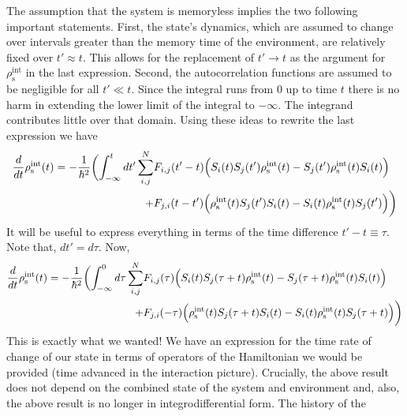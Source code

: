 \documentclass{article}
\begin{document}
The assumption that the system is memoryless implies the two following important
statements. First, the state's dynamics, which are assumed to change over intervals greater
than the memory time of the environment, are relatively fixed over $ t' \approx
t $. This allows for the replacement of $ t' \rightarrow t $ as the argument for
$ \rho_{\textrm{s}}^{\textrm{int}} $ in the last expression. Second, the
autocorrelation functions are assumed to be negligible for all $ t' \ll t $.
Since the integral runs from 0 up to time $ t $ there is no harm in extending
the lower limit of the integral to $ -\infty $. The integrand contributes little
over that domain. Using these ideas to rewrite the last expression we have
\begin{align}
   \frac{d}{dt} \rho_{\textrm{s}}^{\textrm{int}}(t)
       = -\frac{1}{\hbar^{2}} \biggl( \int_{-\infty}^{t} dt' \sum^{N}_{i,j}
          & F_{i,j}(t'-t) \Bigl(
             S_{i}(t) S_{j}(t') \rho^{\textrm{int}}_{\textrm{s}}(t)
          - S_{j}(t')\rho^{\textrm{int}}_{\textrm{s}}(t) S_{i}(t)
       \Bigr) \\
       +  & F_{j,i}(t-t') \Bigr(
          \rho^{\textrm{int}}_{\textrm{s}}(t) S_{j}(t') S_{i}(t)
          - S_{i}(t) \rho^{\textrm{int}}_{\textrm{s}}(t) S_{j}(t')
            \Bigr) \biggr) \nonumber
\end{align}
It will be useful to express everything in terms of the time difference $ t'-t
\equiv \tau $. Note that, $ dt' = d\tau $. Now,
\begin{align}
   \frac{d}{dt} \rho_{\textrm{s}}^{\textrm{int}}(t)
       = -\frac{1}{\hbar^{2}} \biggl( \int_{-\infty}^{0} d\tau \sum^{N}_{i,j}
          & F_{i,j}(\tau) \Bigl(
             S_{i}(t) S_{j}(\tau+t) \rho^{\textrm{int}}_{\textrm{s}}(t)
          - S_{j}(\tau+t)\rho^{\textrm{int}}_{\textrm{s}}(t) S_{i}(t)
       \Bigr) \label{eq:born_markov_master_equation_in_interaction_picture} \\
       +  & F_{j,i}(-\tau) \Bigr(
          \rho^{\textrm{int}}_{\textrm{s}}(t) S_{j}(\tau+t) S_{i}(t)
          - S_{i}(t) \rho^{\textrm{int}}_{\textrm{s}}(t) S_{j}(\tau+t)
            \Bigr) \biggr) \nonumber
         \end{align}
This is exactly what we wanted! We have an expression for the time rate of
change of our state in terms of operators of the Hamiltonian we would be
provided (time advanced in the interaction picture). Crucially, the above result
does not depend on the combined state of the system and environment and, also,
the above result is no longer in integrodifferential form. The history of the
\end{document}

